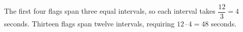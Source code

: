 The first four flags span three equal intervals, so each interval takes $\dfrac{12}{3} = 4$ seconds. Thirteen flags span twelve intervals, requiring $12\cdot4=\boxed{48}$ seconds.

